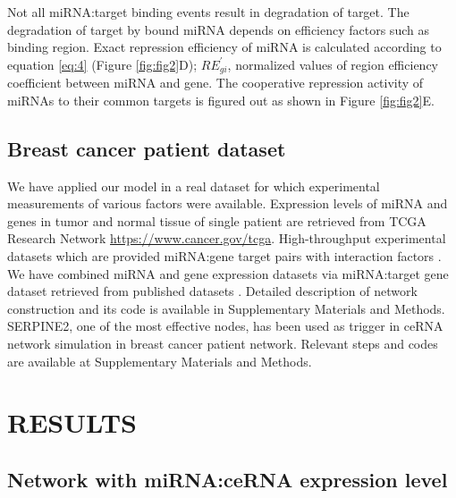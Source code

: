 \documentclass[a4,center,fleqn]{NAR}
\begin{document}
Not all miRNA:target binding events result in degradation of target. The
degradation of target by bound miRNA depends on efficiency factors such
as binding region. Exact repression efficiency of miRNA is calculated
according to equation \eqref{eq:4} (Figure \ref{fig:fig2}D);
\(RE^\prime_{gi}\), normalized values of region efficiency coefficient
between miRNA and gene. The cooperative repression activity of miRNAs to
their common targets is figured out as shown in Figure \ref{fig:fig2}E.

\subsection{Breast cancer patient dataset}

We have applied our model in a real dataset for which experimental
measurements of various factors were available. Expression levels of
miRNA and genes in tumor and normal tissue of single patient are
retrieved from TCGA Research Network \url{https://www.cancer.gov/tcga}.
High-throughput experimental datasets which are provided miRNA:gene
target pairs with interaction factors
\citep{helwak_mapping_2013, moore_mirnatarget_2015}. We have combined
miRNA and gene expression datasets via miRNA:target gene dataset
retrieved from published datasets
\citep{helwak_mapping_2013, moore_mirnatarget_2015}. Detailed
description of network construction and its code is available in
Supplementary Materials and Methods. SERPINE2, one of the most effective
nodes, has been used as trigger in ceRNA network simulation in breast
cancer patient network. Relevant steps and codes are available at
Supplementary Materials and Methods.

\section{RESULTS}

\subsection{Network with miRNA:ceRNA expression level}
\end{document}
